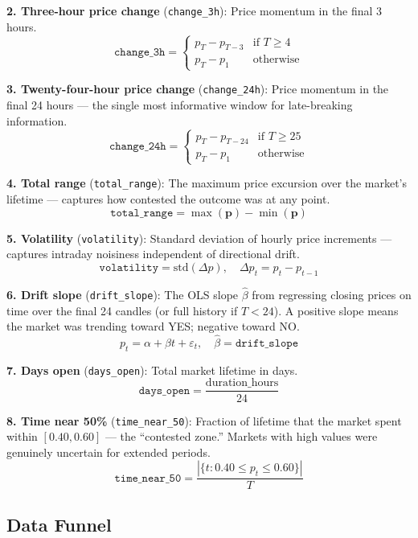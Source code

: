 \documentclass[11pt, a4paper]{article}
\begin{document}
\noindent\textbf{2. Three-hour price change} (\texttt{change\_3h}): Price momentum in the final 3 hours.
\[
\texttt{change\_3h} = \begin{cases} p_T - p_{T-3} & \text{if } T \geq 4 \\ p_T - p_1 & \text{otherwise} \end{cases}
\]

\noindent\textbf{3. Twenty-four-hour price change} (\texttt{change\_24h}): Price momentum in the final 24 hours — the single most informative window for late-breaking information.
\[
\texttt{change\_24h} = \begin{cases} p_T - p_{T-24} & \text{if } T \geq 25 \\ p_T - p_1 & \text{otherwise} \end{cases}
\]

\noindent\textbf{4. Total range} (\texttt{total\_range}): The maximum price excursion over the market's lifetime — captures how contested the outcome was at any point.
\[
\texttt{total\_range} = \max(\mathbf{p}) - \min(\mathbf{p})
\]

\noindent\textbf{5. Volatility} (\texttt{volatility}): Standard deviation of hourly price increments — captures intraday noisiness independent of directional drift.
\[
\texttt{volatility} = \mathrm{std}\!\left(\Delta p\right), \quad \Delta p_t = p_t - p_{t-1}
\]

\noindent\textbf{6. Drift slope} (\texttt{drift\_slope}): The OLS slope $\hat{\beta}$ from regressing closing prices on time over the final 24 candles (or full history if $T < 24$). A positive slope means the market was trending toward YES; negative toward NO.
\[
p_t = \alpha + \beta t + \varepsilon_t, \quad \hat{\beta} = \texttt{drift\_slope}
\]

\noindent\textbf{7. Days open} (\texttt{days\_open}): Total market lifetime in days.
\[
\texttt{days\_open} = \frac{\text{duration\_hours}}{24}
\]

\noindent\textbf{8. Time near 50\%} (\texttt{time\_near\_50}): Fraction of lifetime that the market spent within $[0.40, 0.60]$ — the ``contested zone.'' Markets with high values were genuinely uncertain for extended periods.
\[
\texttt{time\_near\_50} = \frac{\left|\{t : 0.40 \leq p_t \leq 0.60\}\right|}{T}
\]

\subsection{Data Funnel}
\end{document}
